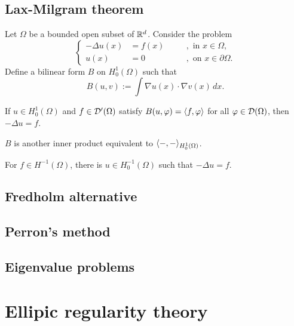 \documentclass{../note}
\begin{document}
\section{Lax-Milgram theorem}
\begin{prb}
Let $\Omega$ be a bounded open subset of $\mathbb{R}^d$.
Consider the problem
\[\left\{\begin{alignedat}{2}
-\Delta u(x)&=f(x)&\quad&,\text{ in }x\in\Omega,\\
u(x)&=0&&,\text{ on }x\in\partial\Omega.
\end{alignedat}\right.\]
Define a bilinear form $B$ on $H_0^1(\Omega)$ such that
\[B(u,v):=\int\nabla u(x)\cdot\nabla v(x)\,dx.\]
\begin{parts}
\item If $u\in H_0^1(\Omega)$ and $f\in\mathcal{D}'(\Omega)$ satisfy $B(u,\varphi)=\langle f,\varphi\rangle$ for all $\varphi\in\mathcal{D}(\Omega)$, then $-\Delta u=f$.
\item $B$ is another inner product equivalent to $\langle-,-\rangle_{H_0^1(\Omega)}$.
\item For $f\in H^{-1}(\Omega)$, there is $u\in H_0^{-1}(\Omega)$ such that $-\Delta u=f$.
\end{parts}
\end{prb}

\section{Fredholm alternative}

\section{Perron's method}

\section{Eigenvalue problems}






\chapter{Ellipic regularity theory}
\end{document}
